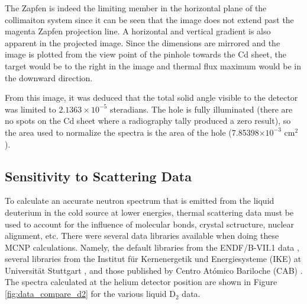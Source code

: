\documentclass[5p,12pt]{elsarticle}
\begin{document}
The Zapfen is indeed the limiting member in the horizontal plane of the collimaiton system since it can be seen that the image does not extend past the magenta Zapfen projection line.  A horizontal and vertical gradient is also apparent in the projected image.  Since the dimensions are mirrored and the image is plotted from the view point of the pinhole towards the Cd sheet, the target would be to the right in the image and thermal flux maximum would be in the downward direction.

From this image, it was deduced that the total solid angle visible to the detector was limited to $2.1363\times10^{-5}$ steradians.  The hole is fully illuminated (there are no spots on the Cd sheet where a radiography tally produced a zero result), so the area used to normalize the spectra is the area of the hole (7.85398$\times 10^{-3}$ cm$^2$).

%
%
%
%
%

\subsection{Sensitivity to Scattering Data}
\label{subsec:data}

To calculate an accurate neutron spectrum that is emitted from the liquid deuterium in the cold source at lower energies, thermal scattering data must be used to account for the influence of molecular bonds, crystal sctructure, nuclear alignment, etc.   There were several data libraries available when doing these MCNP calculations.  Namely, the default libraries from the ENDF/B-VII.1 data \cite{endf_d2}, several libraries from the Institut f\"{u}r Kernenergetik und Energiesysteme (IKE) at Universit\"{a}t Stuttgart \cite{IKE}, and those published by Centro At\'{o}mico Bariloche (CAB) \cite{granada_d2}.  The spectra calculated at the helium detector position are shown in Figure \ref{fig:data_compare_d2} for the various liquid D$_2$ data.
\end{document}
